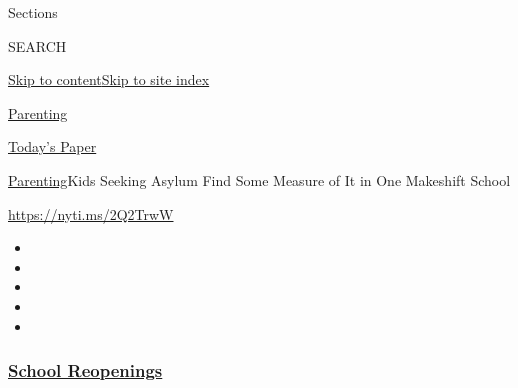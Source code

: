 Sections

SEARCH

\protect\hyperlink{site-content}{Skip to
content}\protect\hyperlink{site-index}{Skip to site index}

\href{https://www.nytimes3xbfgragh.onion/section/parenting}{Parenting}

\href{https://myaccount.nytimes3xbfgragh.onion/auth/login?response_type=cookie\&client_id=vi}{}

\href{https://www.nytimes3xbfgragh.onion/section/todayspaper}{Today's
Paper}

\href{/section/parenting}{Parenting}\textbar{}Kids Seeking Asylum Find
Some Measure of It in One Makeshift School

\url{https://nyti.ms/2Q2TrwW}

\begin{itemize}
\item
\item
\item
\item
\item
\end{itemize}

\hypertarget{school-reopenings}{%
\subsubsection{\texorpdfstring{\href{https://www.nytimes3xbfgragh.onion/spotlight/schools-reopening?name=styln-coronavirus-schools-reopening\&region=TOP_BANNER\&block=storyline_menu_recirc\&action=click\&pgtype=Article\&impression_id=4a530b40-f4d1-11ea-b32a-256dc0696bd9\&variant=undefined}{School
Reopenings}}{School Reopenings}}\label{school-reopenings}}

